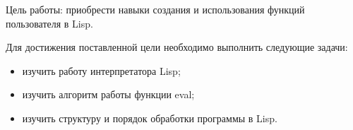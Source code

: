 \Introduction

Цель работы: приобрести навыки создания и использования функций пользователя в Lisp.

Для достижения поставленной цели необходимо выполнить следующие задачи:

\begin{itemize}[$\bullet$]
	\item изучить работу интерпретатора Lisp;
	\item изучить алгоритм работы функции eval;
	\item изучить структуру и порядок обработки программы в Lisp.
\end{itemize}
